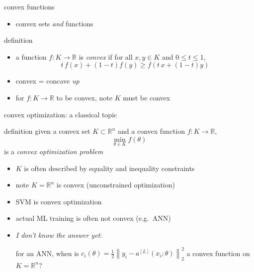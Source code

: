 \documentclass[svgnames,
               hyperref={colorlinks,citecolor=DeepPink4,linkcolor=FireBrick,urlcolor=Maroon},
               usepdftitle=false]  %
               {beamer}
\newcommand{\RR}{\mathbb{R}}
\begin{document}
\begin{frame}{convex functions}

\begin{itemize}
\item convex sets \emph{and} functions
\end{itemize}

\begin{block}{definition}
\begin{itemize}
\item a function $f:K \to \RR$ is \emph{convex} if for all $x,y \in K$ and $0 \le t \le 1$,
  $$t\, f(x) + (1-t) f(y) \ge f(t\, x + (1-t) y)$$
\end{itemize}
\end{block}

\begin{itemize}
\item convex = concave \emph{up}
\item for $f:K\to \RR$ to be convex, note $K$ must be convex
\end{itemize}
\end{frame}


\begin{frame}{convex optimization: a classical topic}

\begin{block}{definition}
given a convex set $K \subset \RR^n$ and a convex function $f:K\to \RR$,
    $$\min_{\theta \in K} f(\theta)$$
is a \emph{convex optimization problem}
\end{block}

\begin{itemize}
\item $K$ is often described by equality and inequality constraints
\item note $K=\RR^n$ is convex (unconstrained optimization)
\item SVM is convex optimization
\item actual ML training is often not convex (e.g.~ANN)
\item \emph{I don't know the answer yet}:

for an ANN, when is $c_i(\theta) = \frac{1}{2} \left\|y_i - a^{[L]}(x_i; \theta)\right\|_2^2$ a convex function on $K = \RR^n$?
\end{itemize}
\end{frame}
\end{document}
